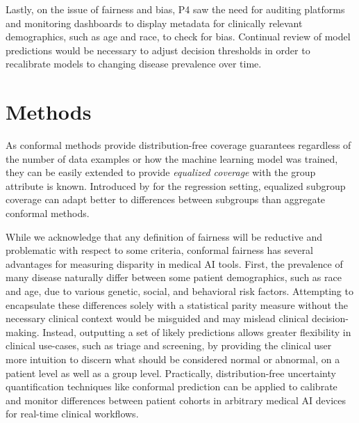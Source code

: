 \documentclass[letterpaper]{article} %
\begin{document}
    Lastly, on the issue of fairness and bias, P4 saw the need for auditing platforms and monitoring dashboards to display metadata for clinically relevant demographics, such as age and race, to check for bias.
    Continual review of model predictions would be necessary to adjust decision thresholds in order to recalibrate models to changing disease prevalence over time.

\section{Methods}
    As conformal methods provide distribution-free coverage guarantees regardless of the number of data examples or how the machine learning model was trained, they can be easily extended to provide \textit{equalized coverage} with the group attribute is known.
    Introduced by \citet{Romano2020With} for the regression setting, equalized subgroup coverage can adapt better to differences between subgroups than aggregate conformal methods.

    While we acknowledge that any definition of fairness will be reductive and problematic with respect to some criteria, conformal fairness has several advantages for measuring disparity in medical AI tools.
    First, the prevalence of many disease naturally differ between some patient demographics, such as race and age, due to various genetic, social, and behavioral risk factors.
    Attempting to encapsulate these differences solely with a statistical parity measure without the necessary clinical context would be misguided and may mislead clinical decision-making.
    Instead, outputting a set of likely predictions allows greater flexibility in clinical use-cases, such as triage and screening, by providing the clinical user more intuition to discern what should be considered normal or abnormal, on a patient level as well as a group level.
    Practically, distribution-free uncertainty quantification techniques like conformal prediction can be applied to calibrate and monitor differences between patient cohorts in arbitrary medical AI devices for real-time clinical workflows.
\end{document}
